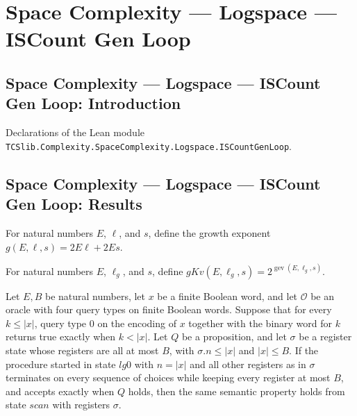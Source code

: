 \section{Space Complexity --- Logspace --- ISCount Gen Loop}
\subsection*{Space Complexity --- Logspace --- ISCount Gen Loop: Introduction}

Declarations of the Lean module \texttt{TCSlib.Complexity.SpaceComplexity.Logspace.ISCountGenLoop}.

\subsection*{Space Complexity --- Logspace --- ISCount Gen Loop: Results}

\begin{definition}
\label{Complexity.LogProg.ISGen.gev}
\leanok
For natural numbers $E$, $\ell$, and $s$, define the growth exponent
$g(E,\ell,s)=2E\ell+2Es$.
\end{definition}

\begin{definition}
\label{Complexity.LogProg.ISGen.gKv}
\leanok
{}
For natural numbers $E$, $\ell_g$, and $s$, define
$gKv(E,\ell_g,s)=2^{\operatorname{gev}(E,\ell_g,s)}$.
\end{definition}

\begin{theorem}
\label{Complexity.LogProg.ISGen.gscan_run}
\leanok
{}
Let $E,B$ be natural numbers, let $x$ be a finite Boolean word, and let $\mathcal O$ be
an oracle with four query types on finite Boolean words. Suppose that for every $k\le
|x|$, query type $0$ on the encoding of $x$ together with the binary word for $k$
returns true exactly when $k<|x|$. Let $Q$ be a proposition, and let $\sigma$ be a
register state whose registers are all at most $B$, with $\sigma.n\le |x|$ and $|x|\le
B$. If the procedure started in state $lg0$ with $n=|x|$ and all other registers as in
$\sigma$ terminates on every sequence of choices while keeping every register at most
$B$, and accepts exactly when $Q$ holds, then the same semantic property holds from
state $scan$ with registers $\sigma$.
\end{theorem}

